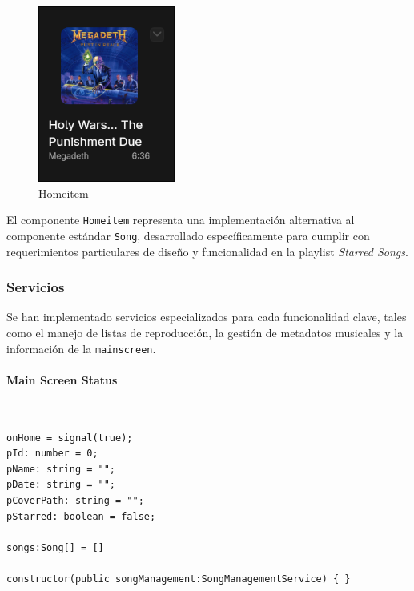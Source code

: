 \documentclass[11pt, a4paper]{article}
\begin{document}
                \begin{figure}[H]
                    \centering
                    \includegraphics[width=0.4\textwidth]{media/screenshots/homeitem.png}
                    \caption{Homeitem}
                    \label{fig:homeitem}
                \end{figure}

                El componente \texttt{Homeitem} representa una implementación alternativa al componente estándar \texttt{Song}, desarrollado específicamente para cumplir con requerimientos particulares de diseño y funcionalidad en la playlist \textit{Starred Songs}.

            \subsubsection{Servicios}

            Se han implementado servicios especializados para cada funcionalidad clave, tales como el manejo de listas de reproducción, la gestión de metadatos musicales y la información de la \texttt{mainscreen}.

                \paragraph{Main Screen Status}
                ‎

                \begin{lstlisting}[caption={Atributos Main Screen Status}]
onHome = signal(true);
pId: number = 0;
pName: string = "";
pDate: string = "";
pCoverPath: string = "";
pStarred: boolean = false;

songs:Song[] = []

constructor(public songManagement:SongManagementService) { }
                \end{lstlisting}
\end{document}
